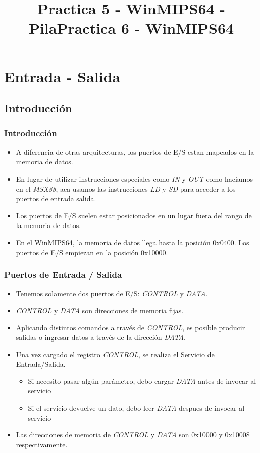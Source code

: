 \documentclass{beamer}
\title{Practica 5 - WinMIPS64 - Pila}
\title{Practica 6 - WinMIPS64}
\begin{document}
\section{Entrada - Salida}

\subsection{Introducción}
\begin{frame}
\frametitle{Introducción}
\begin{itemize}
\item A diferencia de otras arquitecturas, los puertos de E/S estan mapeados en la memoria de datos.
\item En lugar de utilizar instrucciones especiales como \emph{IN} y \emph{OUT} como haciamos en el \emph{MSX88}, aca usamos las instrucciones \emph{LD} y \emph{SD} para acceder a los puertos de entrada salida.
\item Los puertos de E/S suelen estar posicionados en un lugar fuera del rango de la memoria de datos.
\item En el WinMIPS64, la memoria de datos llega hasta la posición 0x0400. Los puertos de E/S empiezan en la posición 0x10000.

\end{itemize}
\end{frame}

\begin{frame}
\frametitle{Puertos de Entrada / Salida}
\begin{itemize}
\item Tenemos solamente dos puertos de E/S:  \emph{CONTROL} y \emph{DATA}.
\item \emph{CONTROL} y \emph{DATA} son direcciones de memoria fijas. 
\item Aplicando distintos comandos a través de \emph{CONTROL}, es posible producir salidas o ingresar datos a través de la dirección \emph{DATA}. 
\item Una vez cargado el registro \emph{CONTROL}, se realiza el Servicio de Entrada/Salida.
\begin{itemize}
\item Si necesito pasar algún parámetro, debo cargar \emph{DATA} antes de invocar al servicio
\item Si el servicio devuelve un dato, debo leer \emph{DATA} despues de invocar al servicio
\end{itemize}
\item Las direcciones de memoria de \emph{CONTROL} y \emph{DATA} son 0x10000 y 0x10008 respectivamente. 
\end{itemize}
\end{frame}
\end{document}
